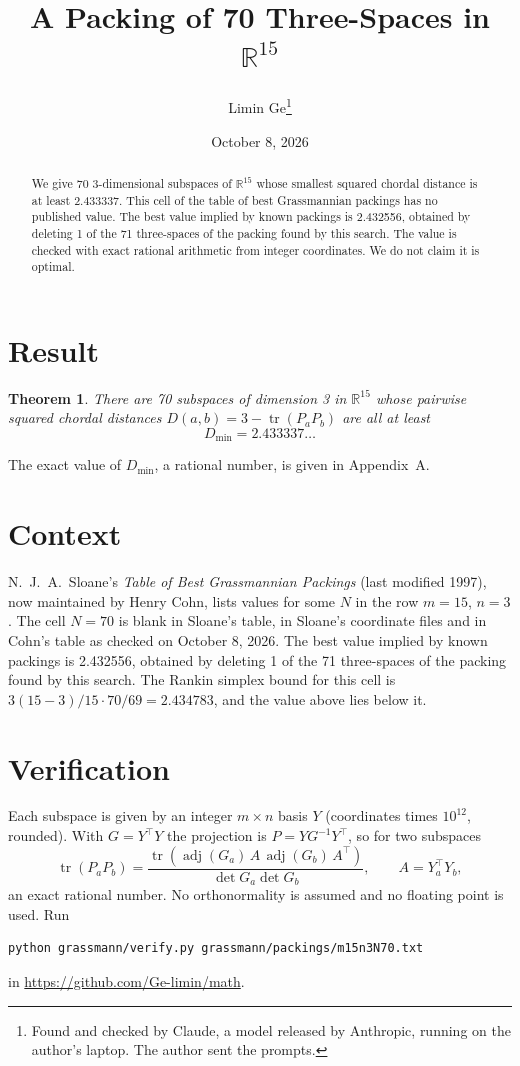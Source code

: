 \documentclass[11pt,a4paper]{article}
\title{A Packing of 70 Three-Spaces in $\mathbb{R}^{15}$}
\author{Limin Ge\thanks{Found and checked by Claude, a model released by Anthropic, running on the author's laptop. The author sent the prompts.}}
\date{October 8, 2026}
\newtheorem*{theorem}{Theorem}
\begin{document}
\maketitle
\begin{abstract}
We give 70 3-dimensional subspaces of $\mathbb{R}^{15}$ whose smallest squared chordal distance is at least 2.433337. This cell of the table of best Grassmannian packings has no published value. The best value implied by known packings is 2.432556, obtained by deleting 1 of the 71 three-spaces of the packing found by this search. The value is checked with exact rational arithmetic from integer coordinates. We do not claim it is optimal.
\end{abstract}

\section{Result}
\begin{theorem}
There are 70 subspaces of dimension 3 in $\mathbb{R}^{15}$ whose pairwise squared chordal distances $D(a,b) = 3 - \operatorname{tr}(P_aP_b)$ are all at least
\[ D_{\min} = 2.433337\ldots \]
\end{theorem}
The exact value of $D_{\min}$, a rational number, is given in Appendix~A.


\section{Context}
N.~J.~A.~Sloane's \emph{Table of Best Grassmannian Packings} (last modified 1997), now maintained by Henry Cohn, lists values for some $N$ in the row $m=15$, $n=3$. The cell $N=70$ is blank in Sloane's table, in Sloane's coordinate files and in Cohn's table as checked on October 8, 2026. The best value implied by known packings is 2.432556, obtained by deleting 1 of the 71 three-spaces of the packing found by this search. The Rankin simplex bound for this cell is $3(15-3)/15\cdot 70/69 = 2.434783$, and the value above lies below it.


\section{Verification}
Each subspace is given by an integer $m\times n$ basis $Y$ (coordinates times $10^{12}$, rounded). With $G=Y^\top Y$ the projection is $P=YG^{-1}Y^\top$, so for two subspaces
\[ \operatorname{tr}(P_aP_b)=\frac{\operatorname{tr}(\operatorname{adj}(G_a)\,A\,\operatorname{adj}(G_b)\,A^\top)}{\det G_a\det G_b},\qquad A=Y_a^\top Y_b, \]
an exact rational number. No orthonormality is assumed and no floating point is used. Run
\begin{verbatim}
python grassmann/verify.py grassmann/packings/m15n3N70.txt
\end{verbatim}
in \url{https://github.com/Ge-limin/math}.
\end{document}
